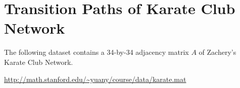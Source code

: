 \documentclass[11pt]{article}
\def\rank{{\mathrm{rank}}}
\begin{document}

\section{Transition Paths of Karate Club Network} 
The following dataset contains a 34-by-34 adjacency matrix $A$ of Zachery's Karate Club Network. 

\url{http://math.stanford.edu/~yuany/course/data/karate.mat}
\end{document}
